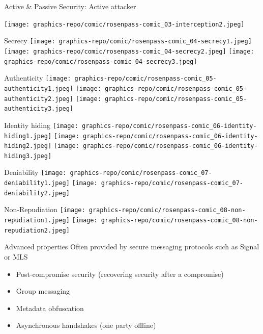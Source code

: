 \begin{frame}{Active \& Passive Security: Active attacker}
  \raggedright
  \texttt{[image: graphics-repo/comic/rosenpass-comic\_03-interception2.jpeg]}
\end{frame}

\begin{frame}{Secrecy}
  \centering
  \texttt{[image: graphics-repo/comic/rosenpass-comic\_04-secrecy1.jpeg]}
  \texttt{[image: graphics-repo/comic/rosenpass-comic\_04-secrecy2.jpeg]}
  \texttt{[image: graphics-repo/comic/rosenpass-comic\_04-secrecy3.jpeg]}
\end{frame}

\begin{frame}{Authenticity}
  \centering
  \texttt{[image: graphics-repo/comic/rosenpass-comic\_05-authenticity1.jpeg]}
  \texttt{[image: graphics-repo/comic/rosenpass-comic\_05-authenticity2.jpeg]}
  \texttt{[image: graphics-repo/comic/rosenpass-comic\_05-authenticity3.jpeg]}
\end{frame}

\begin{frame}{Identity hiding}
  \centering
  \texttt{[image: graphics-repo/comic/rosenpass-comic\_06-identity-hiding1.jpeg]}
  \texttt{[image: graphics-repo/comic/rosenpass-comic\_06-identity-hiding2.jpeg]}
  \texttt{[image: graphics-repo/comic/rosenpass-comic\_06-identity-hiding3.jpeg]}
\end{frame}

\begin{frame}{Deniability}
  \centering
  \texttt{[image: graphics-repo/comic/rosenpass-comic\_07-deniability1.jpeg]}
  \texttt{[image: graphics-repo/comic/rosenpass-comic\_07-deniability2.jpeg]}
\end{frame}

\begin{frame}{Non-Repudiation}
  \centering
  \texttt{[image: graphics-repo/comic/rosenpass-comic\_08-non-repudiation1.jpeg]}
  \texttt{[image: graphics-repo/comic/rosenpass-comic\_08-non-repudiation2.jpeg]}
\end{frame}

\begin{frame}{Advanced properties}
  Often provided by secure messaging protocols such as Signal or MLS

\bigskip
  \begin{itemize}
    \item Post-compromise security (recovering security after a compromise)
    \item Group messaging
    \item Metadata obfuscation
    \item Asynchronous handshakes (one party offline)
  \end{itemize}
\end{frame}

